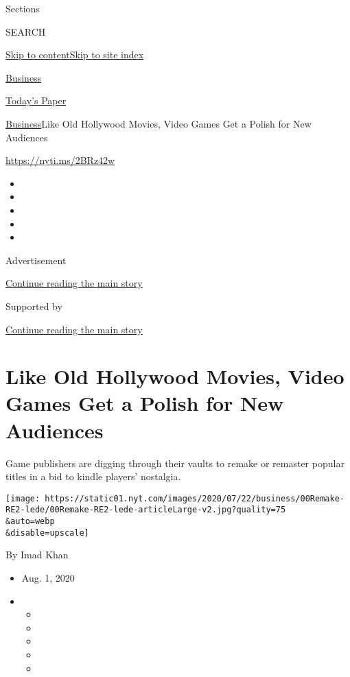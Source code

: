 Sections

SEARCH

\protect\hyperlink{site-content}{Skip to
content}\protect\hyperlink{site-index}{Skip to site index}

\href{https://www.nytimes.com/section/business}{Business}

\href{https://myaccount.nytimes.com/auth/login?response_type=cookie\&client_id=vi}{}

\href{https://www.nytimes.com/section/todayspaper}{Today's Paper}

\href{/section/business}{Business}\textbar{}Like Old Hollywood Movies,
Video Games Get a Polish for New Audiences

\url{https://nyti.ms/2BRz42w}

\begin{itemize}
\item
\item
\item
\item
\item
\end{itemize}

Advertisement

\protect\hyperlink{after-top}{Continue reading the main story}

Supported by

\protect\hyperlink{after-sponsor}{Continue reading the main story}

\hypertarget{like-old-hollywood-movies-video-games-get-a-polish-for-new-audiences}{%
\section{Like Old Hollywood Movies, Video Games Get a Polish for New
Audiences}\label{like-old-hollywood-movies-video-games-get-a-polish-for-new-audiences}}

Game publishers are digging through their vaults to remake or remaster
popular titles in a bid to kindle players' nostalgia.

\texttt{[image: https://static01.nyt.com/images/2020/07/22/business/00Remake-RE2-lede/00Remake-RE2-lede-articleLarge-v2.jpg?quality=75\\\&auto=webp\\\&disable=upscale]}

By Imad Khan

\begin{itemize}
\item
  Aug. 1, 2020
\item
  \begin{itemize}
  \item
  \item
  \item
  \item
  \item
  \end{itemize}
\end{itemize}

